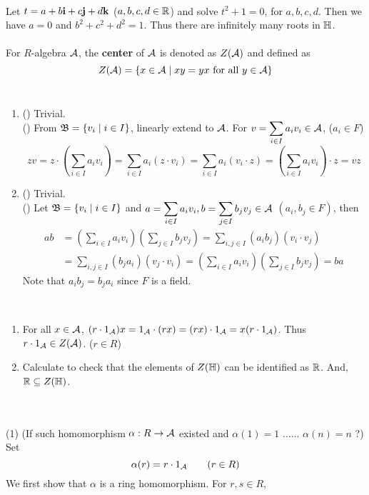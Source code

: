 \\
 Let $t = a+b\mathrm{\mathbf{i}}+c\mathrm{\mathbf{j}}+d\mathrm{\mathbf{k}}$ ($a, b, c, d\in \mathbb{R}$) and solve $t^2+1=0$, for $a, b, c, d$. Then we have $a = 0$ and $b^2+c^2+d^2 = 1$. Thus there are infinitely many roots in $\mathbb{H}$.\\
\\
 For $R$-algebra $\mathcal{A}$, the \textbf{center} of $\mathcal{A}$ is denoted as $Z(\mathcal{A})$ and defined as
$$Z(\mathcal{A}) = \{x\in \mathcal{A} \mid xy=yx \text{ for all } y\in \mathcal{A}\}$$
\\
\begin{enumerate}
	\item (\mimp) Trivial.\\
	(\mimpb) From $\mathfrak{B} = \{v_i \mid i\in I\}$, linearly extend to $\mathcal{A}$. For $\displaystyle v = \sum_{i\in I} a_iv_i\in \mathcal{A}$, ($a_i\in F$)
	$$zv = z\cdot\left(\sum_{i\in I} a_iv_i\right) = \sum_{i\in I} a_i(z\cdot v_i) = \sum_{i\in I} a_i (v_i\cdot z) = \left(\sum_{i\in I} a_iv_i\right)\cdot z = vz$$ 
	\item (\mimp) Trivial.\\
	(\mimpb) Let $\mathfrak{B} = \{v_i \mid i\in I\}$ and $\displaystyle a = \sum_{i\in I} a_iv_i, b = \sum_{j\in I} b_jv_j\in \mathcal{A}$ $(a_i, b_j\in F)$, then
	$$\begin{aligned}
		ab &= \left(\sum_{i\in I} a_iv_i\right)\left(\sum_{j\in I} b_jv_j\right) = \sum_{i,j\in I} (a_ib_j)(v_i\cdot v_j) \\&= \sum_{i,j\in I}(b_ja_i)(v_j\cdot v_i) = \left(\sum_{i\in I} a_iv_i\right)\left(\sum_{j\in I} b_jv_j\right) = ba
	\end{aligned}$$
	Note that $a_ib_j = b_ja_i$ since $F$ is a field.
\end{enumerate}~
\\
\begin{enumerate}
	\item For all $x\in \mathcal{A}$, $(r\cdot 1_{\mathcal{A}})x = 1_{\mathcal{A}}\cdot (rx) = (rx)\cdot 1_{\mathcal{A}} = x(r\cdot 1_{\mathcal{A}})$. Thus $r\cdot 1_{\mathcal{A}}\in Z(\mathcal{A})$. ($r\in R$)
	\item Calculate to check that the elements of $Z(\mathbb{H})$ can be identified as $\mathbb{R}$. And, $\mathbb{R}\subseteq Z(\mathbb{H})$.
\end{enumerate}~
\\
\\
(1) (If such homomorphism $\alpha: R\rightarrow \mathcal{A}$ existed and $\alpha(1) = 1$ ...... $\alpha(n) = n$ ?) Set $$\alpha(r) = r\cdot 1_{\mathcal{A}} \qquad (r\in R)$$
We first show that $\alpha$ is a ring homomorphism. For $r, s\in R$,
